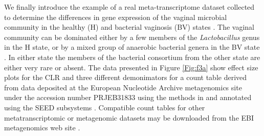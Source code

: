\documentclass[graybox]{svmult}
\begin{document}
 We finally introduce the example of a real meta-transcriptome dataset collected to determine the differences in gene expression of the vaginal microbial community in the healthy (H) and bacterial vaginosis (BV) states \cite{macklaim:2013,Denge00262-18}. The vaginal community can be dominated either by a few members of the \textit{Lactobacillus} genus in the H state, or by a mixed group of anaerobic bacterial genera in the BV state \cite{Ravel:2010}. In either state the members of the bacterial consortium from the other state are either very rare or absent. The data presented in Figure \ref{Fig:f3a} show effect size plots for the CLR and three different demonimators for a count table  derived from data deposited at the European Nucleotide Archive metagenomics site under the accession number PRJEB31833 using  the  methods in \cite{Macklaim:2018aa} and annotated using the SEED subsystems \cite{Overbeek:2014aa}. Compatible count tables for other metatranscriptomic or metagenomic datasets may be downloaded from the EBI metagenomics web site \cite{Mitchell:2018aa}.
\end{document}

